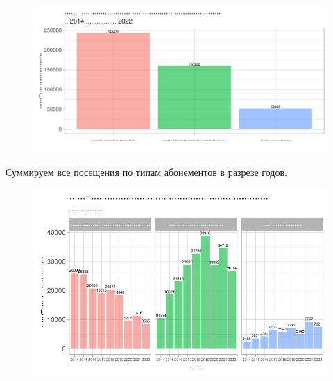 \documentclass[
  letterpaper,
  DIV=11,
  numbers=noendperiod]{scrreprt}
\begin{document}
\begin{figure}

{\centering \includegraphics{./intro_files/figure-pdf/unnamed-chunk-16-1.pdf}

}

\end{figure}

Суммируем все посещения по типам абонементов в разрезе годов.

\begin{figure}

{\centering \includegraphics{./intro_files/figure-pdf/unnamed-chunk-17-1.pdf}

}

\end{figure}
\end{document}
